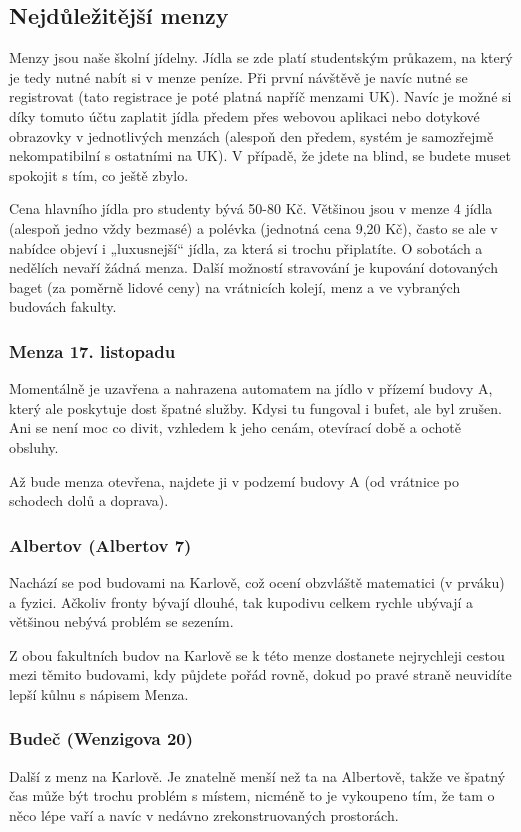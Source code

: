 \subsection{Nejdůležitější menzy}
Menzy jsou naše školní jídelny. Jídla se zde platí studentským průkazem, na
který je tedy nutné nabít si v menze peníze. Při první návštěvě je navíc nutné
se registrovat (tato registrace je poté platná napříč menzami UK). Navíc je
možné si díky tomuto účtu zaplatit jídla předem přes webovou aplikaci nebo
dotykové obrazovky v jednotlivých menzách (alespoň den předem, systém je
samozřejmě nekompatibilní s ostatními na UK). V případě, že jdete na blind, se
budete muset spokojit s tím, co ještě zbylo.

Cena hlavního jídla pro studenty bývá 50-80 Kč. Většinou jsou v menze 4 jídla
(alespoň jedno vždy bezmasé) a polévka (jednotná cena 9,20 Kč), často se ale v
nabídce objeví i „luxusnejší“ jídla, za která si trochu připlatíte. O sobotách a
nedělích nevaří žádná menza. Další možností stravování je kupování dotovaných
baget (za poměrně lidové ceny) na vrátnicích kolejí, menz a ve vybraných
budovách fakulty.


\subsubsection{Menza 17. listopadu}
Momentálně je uzavřena a nahrazena automatem na jídlo v přízemí budovy A, který
ale poskytuje dost špatné služby. Kdysi tu fungoval i bufet, ale byl zrušen. Ani
se není moc co divit, vzhledem k jeho cenám, otevírací době a ochotě obsluhy.

Až bude menza otevřena, najdete ji v podzemí budovy A (od vrátnice po schodech
dolů a doprava).


\subsubsection{Albertov (Albertov 7)}
Nachází se pod budovami na Karlově, což ocení obzvláště matematici (v prváku) a
fyzici. Ačkoliv fronty bývají dlouhé, tak kupodivu celkem rychle ubývají a
většinou nebývá problém se sezením.

Z obou fakultních budov na Karlově se k této menze dostanete nejrychleji cestou
mezi těmito budovami, kdy půjdete pořád rovně, dokud po pravé straně neuvidíte
lepší kůlnu s nápisem Menza.


\subsubsection{Budeč (Wenzigova 20)}
Další z menz na Karlově. Je znatelně menší než ta na Albertově, takže ve špatný
čas může být trochu problém s místem, nicméně to je vykoupeno tím, že tam o něco
lépe vaří a navíc v nedávno zrekonstruovaných prostorách.

